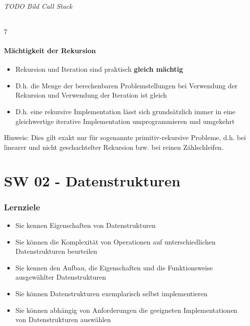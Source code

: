 \documentclass[10pt,a4paper]{article}
\begin{document}
\paragraph{TODO Bild Call Stack}7

\subsection{Mächtigkeit der Rekursion}
\begin{itemize}[noitemsep,topsep=0pt,leftmargin=*]
    \item Rekursion und Iteration sind praktisch \textbf{gleich mächtig}
    \item D.h. die Menge der berechenbaren Problemstellungen bei Verwendung der Rekursion und Verwendung der Iteration ist gleich
    \item D.h. eine rekursive Implementation lässt sich grundsätzlich immer in eine gleichwertige iterative Implementation umprogrammieren und umgekehrt
\end{itemize}
Hinweis: Dies gilt exakt nur für sogenannte primitiv-rekursive Probleme, d.h. bei linearer und nicht geschachtelter Rekursion bzw. bei reinen Zählschleifen.


\part{SW 02 - Datenstrukturen}
\section{Lernziele}
\begin{itemize}[noitemsep,topsep=0pt,leftmargin=*]
    \item Sie kennen Eigenschaften von Datenstrukturen
    \item Sie können die Komplexität von Operationen auf unterschiedlichen Datenstrukturen beurteilen
    \item Sie kennen den Aufbau, die Eigenschaften und die Funktionsweise ausgewählter Datenstrukturen
    \item Sie können Datenstrukturen exemplarisch selbst implementieren
    \item Sie können abhängig von Anforderungen die geeigneten Implementationen von Datenstrukturen auswählen
\end{itemize}
\end{document}
